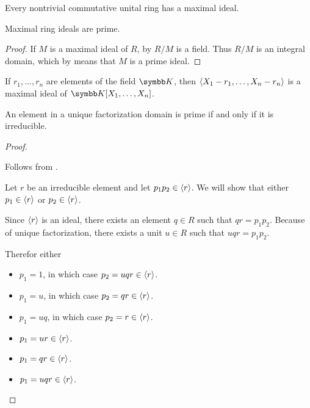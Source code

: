 \begin{theorem}\label{thm:krulls_theorem}\cite{Hodges1979}
  Every nontrivial commutative unital ring has a maximal ideal.
\end{theorem}

\begin{proposition}\label{thm:maximal_ideals_are_prime}
  Maximal ring ideals are prime.
\end{proposition}
\begin{proof}
  If \( M \) is a maximal ideal of \( R \), by  \( R / M \) is a field. Thus \( R / M \) is an integral domain, which by  means that \( M \) is a prime ideal.
\end{proof}

\begin{proposition}\label{thm:field_maximal_ideal_representation}\cite[exercise 8.1]{Коцев2016}
  If \( r_1, \ldots, r_n \) are elements of the field \( \BK \), then \( \left\langle X_1 - r_1, \ldots, X_n - r_n \right\rangle \) is a maximal ideal of \( \BK[X_1, \ldots, X_n] \).
\end{proposition}

\begin{proposition}\label{thm:ufd_prime_iff_irreducible}
  An element in a unique factorization domain is prime if and only if it is irreducible.
\end{proposition}
\begin{proof}
  \begin{description}
    \Implies Follows from .

    \ImpliedBy Let \( r \) be an irreducible element and let \( p_1 p_2 \in \left\langle r \right\rangle \). We will show that either  \( p_1 \in \left\langle r \right\rangle \) or \( p_2 \in \left\langle r \right\rangle \).

    Since \( \left\langle r \right\rangle \) is an ideal, there exists an element \( q \in R \) such that \( qr = p_1 p_2 \). Because of unique factorization, there exists a unit \( u \in R \) such that \( uqr = p_1 p_2  \).

    Therefor either
    \begin{itemize}
      \item \( p_1 = 1 \), in which case \( p_2 = uqr \in \left\langle r \right\rangle \).
      \item \( p_1 = u \), in which case \( p_2 = qr \in \left\langle r \right\rangle \).
      \item \( p_1 = uq \), in which case \( p_2 = r \in \left\langle r \right\rangle \).
      \item \( p_1 = ur \in \left\langle r \right\rangle \).
      \item \( p_1 = qr \in \left\langle r \right\rangle \).
      \item \( p_1 = uqr \in \left\langle r \right\rangle \).
    \end{itemize}
  \end{description}
\end{proof}

